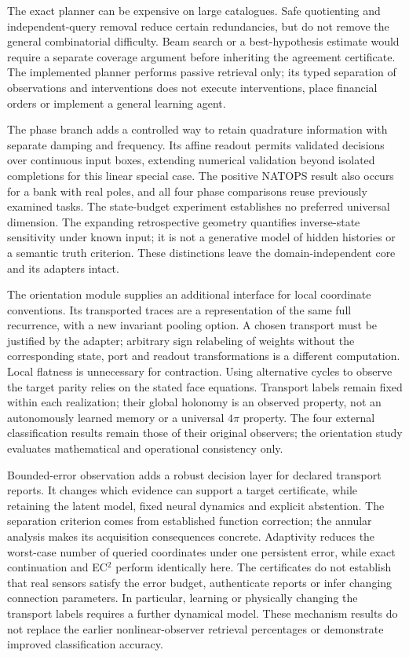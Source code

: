 \documentclass[11pt,a4paper]{article}
\theoremstyle{definition}\newtheorem{definition}[theorem]{Definition}
\begin{document}
The exact planner can be expensive on large catalogues. Safe quotienting and independent-query removal reduce certain redundancies, but do not remove the general combinatorial difficulty. Beam search or a best-hypothesis estimate would require a separate coverage argument before inheriting the agreement certificate. The implemented planner performs passive retrieval only; its typed separation of observations and interventions does not execute interventions, place financial orders or implement a general learning agent.

The phase branch adds a controlled way to retain quadrature information with separate damping and frequency. Its affine readout permits validated decisions over continuous input boxes, extending numerical validation beyond isolated completions for this linear special case. The positive NATOPS result also occurs for a bank with real poles, and all four phase comparisons reuse previously examined tasks. The state-budget experiment establishes no preferred universal dimension. The expanding retrospective geometry quantifies inverse-state sensitivity under known input; it is not a generative model of hidden histories or a semantic truth criterion. These distinctions leave the domain-independent core and its adapters intact.

The orientation module supplies an additional interface for local coordinate conventions. Its transported traces are a representation of the same full recurrence, with a new invariant pooling option. A chosen transport must be justified by the adapter; arbitrary sign relabeling of weights without the corresponding state, port and readout transformations is a different computation. Local flatness is unnecessary for contraction. Using alternative cycles to observe the target parity relies on the stated face equations. Transport labels remain fixed within each realization; their global holonomy is an observed property, not an autonomously learned memory or a universal $4\pi$ property. The four external classification results remain those of their original observers; the orientation study evaluates mathematical and operational consistency only.

Bounded-error observation adds a robust decision layer for declared transport reports. It changes which evidence can support a target certificate, while retaining the latent model, fixed neural dynamics and explicit abstention. The separation criterion comes from established function correction; the annular analysis makes its acquisition consequences concrete. Adaptivity reduces the worst-case number of queried coordinates under one persistent error, while exact continuation and EC$^2$ perform identically here. The certificates do not establish that real sensors satisfy the error budget, authenticate reports or infer changing connection parameters. In particular, learning or physically changing the transport labels requires a further dynamical model. These mechanism results do not replace the earlier nonlinear-observer retrieval percentages or demonstrate improved classification accuracy.
\end{document}
